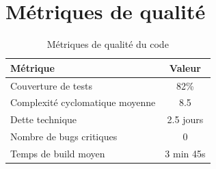 \documentclass[a4paper,11pt]{report}
\begin{document}
\chapter{Métriques de qualité}

\begin{table}[H]
    \centering
    \begin{tabular}{|l|c|}
    \hline
    \textbf{Métrique} & \textbf{Valeur} \\ \hline
    Couverture de tests & 82\% \\ \hline
    Complexité cyclomatique moyenne & 8.5 \\ \hline
    Dette technique & 2.5 jours \\ \hline
    Nombre de bugs critiques & 0 \\ \hline
    Temps de build moyen & 3 min 45s \\ \hline
    \end{tabular}
    \caption{Métriques de qualité du code}
    \label{tab:quality_metrics}
\end{table}
\end{document}

